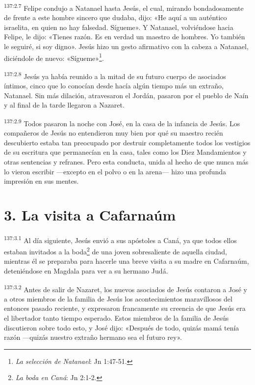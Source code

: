 \par 
\textsuperscript{137:2.7} Felipe condujo a Natanael hasta Jesús, el cual, mirando bondadosamente de frente a este hombre sincero que dudaba, dijo: «He aquí a un auténtico israelita, en quien no hay falsedad. Sígueme». Y Natanael, volviéndose hacia Felipe, le dijo: «Tienes razón. Es en verdad un maestro de hombres. Yo también le seguiré, si soy digno». Jesús hizo un gesto afirmativo con la cabeza a Natanael, diciéndole de nuevo: «Sígueme»\footnote{\textit{La selección de Natanael}: Jn 1:47-51.}.

\par 
\textsuperscript{137:2.8} Jesús ya había reunido a la mitad de su futuro cuerpo de asociados íntimos, cinco que lo conocían desde hacía algún tiempo más un extraño, Natanael. Sin más dilación, atravesaron el Jordán, pasaron por el pueblo de Naín y al final de la tarde llegaron a Nazaret.

\par 
\textsuperscript{137:2.9} Todos pasaron la noche con José, en la casa de la infancia de Jesús. Los compañeros de Jesús no entendieron muy bien por qué su maestro recién descubierto estaba tan preocupado por destruir completamente todos los vestigios de su escritura que permanecían en la casa, tales como los Diez Mandamientos y otras sentencias y refranes. Pero esta conducta, unida al hecho de que nunca más lo vieron escribir ---excepto en el polvo o en la arena--- hizo una profunda impresión en sus mentes.

\section*{3. La visita a Cafarnaúm}
\par 
\textsuperscript{137:3.1} Al día siguiente, Jesús envió a sus apóstoles a Caná, ya que todos ellos estaban invitados a la boda\footnote{\textit{La boda en Caná}: Jn 2:1-2.} de una joven sobresaliente de aquella ciudad, mientras él se preparaba para hacerle una breve visita a su madre en Cafarnaúm, deteniéndose en Magdala para ver a su hermano Judá.

\par 
\textsuperscript{137:3.2} Antes de salir de Nazaret, los nuevos asociados de Jesús contaron a José y a otros miembros de la familia de Jesús los acontecimientos maravillosos del entonces pasado reciente, y expresaron francamente su creencia de que Jesús era el libertador tanto tiempo esperado. Estos miembros de la familia de Jesús discutieron sobre todo esto, y José dijo: «Después de todo, quizás mamá tenía razón ---quizás nuestro extraño hermano sea el futuro rey».

